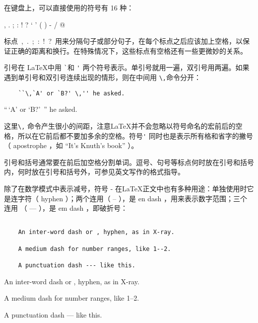 在键盘上，可以直接使用的符号有 16 种：

, \quad . \quad ; \quad : \quad ! \quad ? \quad ` \quad ' \quad ( \quad ) \quad [ \quad ] \quad - \quad /  \quad * \quad @

标点\ ,\ .\ ;\ :\ !\ ?\ 用来分隔句子或部分句子，在每个标点之后应该加上空格，以保证正确的距离和换行。在特殊情况下，这些标点有空格还有一些更微妙的关系。

引号在 \LaTeX 中用 \verb|`|和 \verb|'| 两个符号表示。单引号就用一遍，双引号用两遍。如果遇到单引号和双引号连续出现的情形，则在中间用 \verb|\,|命令分开：

\begin{minipage}[t]{0.45\textwidth}
    \begin{lstlisting}
    ``\,`A' or `B?' \,'' he asked.
    \end{lstlisting}
\end{minipage}
\hfill
\begin{minipage}[t]{0.45\textwidth}
    \vspace{0.1cm}
    \hspace{0.5cm}
    ``\,`A' or `B?' \,'' he asked.
\end{minipage}
这里\verb|\,| 命令产生很小的间距，注意\LaTeX 并不会忽略以符号命名的宏前后的空格，所以在它前后都不要加多余的空格。符号\verb|'| 同时也是表示所有格和省字的撇号 （ apostrophe ，如 ``It's Knuth's book'' ）。

引号和括号通常要在前后加空格分割单词。逗号、句号等标点何时放在引号和括号内，何时放在引号和括号外，可参见英文写作的格式指导。

除了在数学模式中表示减号，符号 - 在\LaTeX 正文中也有多种用途：单独使用时它是连字符（ hyphen ）；两个连用（ -- ），是 en dash ，用来表示数字范围；三个连用 （ --- ），是 em dash ，即破折号：

\begin{minipage}[t]{0.45\textwidth}
    \begin{lstlisting}
        
    An inter-word dash or , hyphen, as in X-ray.

    A medium dash for number ranges, like 1--2.

    A punctuation dash --- like this.
    \end{lstlisting}
\end{minipage}
\hfill
\begin{minipage}[t]{0.45\textwidth}
    \vspace{0.1cm}
    \hspace{0.5cm}

    An inter-word dash or , hyphen, as in X-ray.

    A medium dash for number ranges, like 1--2.

    A punctuation dash --- like this.
\end{minipage}


